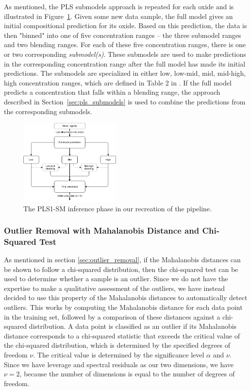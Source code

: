 As mentioned, the PLS submodels approach is repeated for each oxide and is illustrated in Figure~\ref{fig:pls_inference}.
Given some new data sample, the full model gives an initial compositional prediction for its oxide.
Based on this prediction, the data is then "binned" into one of five concentration ranges -- the three submodel ranges and two blending ranges.
For each of these five concentration ranges, there is one or two corresponding \textit{submodel(s)}.
These submodels are used to make predictions in the corresponding concentration range after the full model has made its initial predictions.
The submodels are specialized in either low, low-mid, mid, mid-high, high concentration ranges, which are defined in Table 2 in \citet{andersonImprovedAccuracyQuantitative2017}.
If the full model predicts a concentration that falls within a blending range, the approach described in Section~\ref{sec:pls_submodels} is used to combine the predictions from the corresponding submodels.

\begin{figure}
	\centering
	\includegraphics[width=0.45\textwidth]{images/pls_inference.png}
	\caption{The PLS1-SM inference phase in our recreation of the pipeline.}
	\label{fig:pls_inference}
\end{figure}

\subsubsection{Outlier Removal with Mahalanobis Distance and Chi-Squared Test}\label{sec:methodology_outlier_removal}
As mentioned in section \ref{sec:outlier_removal}, if the Mahalanobis distances can be shown to follow a chi-squared distribution, then the chi-squared test can be used to determine whether a sample is an outlier.
Since we do not have the expertise to make a qualitative assessment of the outliers, we have instead decided to use this property of the Mahalanobis distances to automatically detect outliers.
This works by computing the Mahalanobis distance for each data point in the training set, followed by a comparison of these distances against a chi-squared distribution.
A data point is classified as an outlier if its Mahalanobis distance corresponds to a chi-squared statistic that exceeds the critical value of the chi-squared distribution, which is determined by the specified degrees of freedom $\nu$.
The critical value is determined by the significance level $\alpha$ and $\nu$.
Since we have leverage and spectral residuals as our two dimensions, we have $\nu = 2$, because the number of dimensions is equal to the number of degrees of freedom\cite{aggarwal_outlier_2017}.

